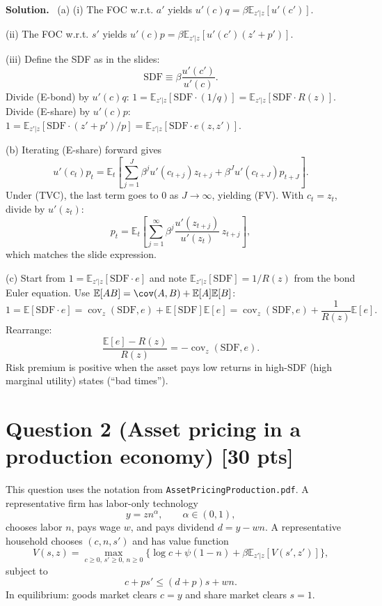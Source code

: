 \documentclass[12pt]{article}
\newenvironment{sol}{\par\smallskip\noindent\textbf{Solution.}\ }{\par\medskip}
\newcommand{\pts}[1]{\hfill{\small[#1 pts]}}
\newcommand{\E}{\mathbb{E}}
\newcommand{\covz}{\operatorname{cov}_z}
\begin{document}
\begin{sol}
(a)
(i) The FOC w.r.t. \(a'\) yields \(u'(c)q=\beta\E_{z'|z}[u'(c')]\).

(ii) The FOC w.r.t. \(s'\) yields \(u'(c)p=\beta\E_{z'|z}[u'(c')(z'+p')]\).

(iii) Define the SDF as in the slides:
\[
\text{SDF}\equiv \beta\frac{u'(c')}{u'(c)}.
\]
Divide (E-bond) by \(u'(c)q\): \(1=\E_{z'|z}[\text{SDF}\cdot (1/q)]=\E_{z'|z}[\text{SDF}\cdot R(z)]\).
Divide (E-share) by \(u'(c)p\): \(1=\E_{z'|z}[\text{SDF}\cdot (z'+p')/p]=\E_{z'|z}[\text{SDF}\cdot e(z,z')]\).

(b) Iterating (E-share) forward gives
\[
u'(c_t)p_t=\E_t\!\left[\sum_{j=1}^{J}\beta^j u'(c_{t+j})z_{t+j}+\beta^{J}u'(c_{t+J})p_{t+J}\right].
\]
Under (TVC), the last term goes to 0 as \(J\to\infty\), yielding (FV).
With \(c_t=z_t\), divide by \(u'(z_t)\):
\[
p_t=\E_t\!\left[\sum_{j=1}^\infty \beta^j \frac{u'(z_{t+j})}{u'(z_t)}\,z_{t+j}\right],
\]
which matches the slide expression.

(c) Start from \(1=\E_{z'|z}[\text{SDF}\cdot e]\) and note \(\E_{z'|z}[\text{SDF}]=1/R(z)\) from the bond Euler equation.
Use \(\E[AB]=\cov(A,B)+\E[A]\E[B]\):
\[
1=\E[\text{SDF}\cdot e]=\covz(\text{SDF},e)+\E[\text{SDF}]\E[e]
=\covz(\text{SDF},e)+\frac{1}{R(z)}\E[e].
\]
Rearrange:
\[
\frac{\E[e]-R(z)}{R(z)}=-\covz(\text{SDF},e).
\]
Risk premium is positive when the asset pays low returns in high-SDF (high marginal utility) states (``bad times'').
\end{sol}

\section*{Question 2 (Asset pricing in a production economy) \pts{30}}

This question uses the notation from \texttt{AssetPricingProduction.pdf}.
A representative firm has labor-only technology
\[
y = z n^{\alpha},\qquad \alpha\in(0,1),
\]
chooses labor \(n\), pays wage \(w\), and pays dividend \(d=y-wn\).
A representative household chooses \((c,n,s')\) and has value function
\[
V(s,z)=\max_{c\ge 0,\,s'\ge 0,\,n\ge 0}\Big\{\log c+\psi(1-n)+\beta \E_{z'|z}[V(s',z')]\Big\},
\]
subject to
\[
c + p s' \le (d+p)s + wn.
\]
In equilibrium: goods market clears \(c=y\) and share market clears \(s=1\).
\end{document}
